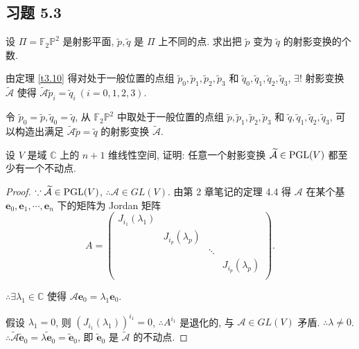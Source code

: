 \documentclass[color=black,device=normal,lang=cn,mode=geye]{elegantnote}
\begin{document}
\subsection{习题 5.3}
\begin{exercise}%
    设 $\varPi=\mathbb{F}_2\mathbb{P}^2$ 是射影平面, $\tilde{p},\tilde{q}$ 是 $\varPi$ 上不同的点. 求出把 $\tilde{p}$ 变为 $\tilde{q}$ 的射影变换的个数.
\end{exercise}
\begin{solution}
    由定理 \ref{t3.10} 得对处于一般位置的点组 $\tilde{p}_0,\tilde{p}_1,\tilde{p}_2,\tilde{p}_3$ 和 $\tilde{q}_0,\tilde{q}_1,\tilde{q}_2,\tilde{q}_3$, $\exists!$ 射影变换 $\widetilde{\mathcal{A}}$ 使得 $\widetilde{\mathcal{A}}\tilde{p}_i=\tilde{q}_i\ (i=0,1,2,3)$.

    令 $\tilde{p}_0=\tilde{p},\tilde{q}_0=\tilde{q}$, 从 $\mathbb{F}_2\mathbb{P}^2$ 中取处于一般位置的点组 $\tilde{p},\tilde{p}_1,\tilde{p}_2,\tilde{p}_3$ 和 $\tilde{q},\tilde{q}_1,\tilde{q}_2,\tilde{q}_3$, 可以构造出满足 $\widetilde{\mathcal{A}}\tilde{p}=\tilde{q}$ 的射影变换 $\widetilde{\mathcal{A}}$.
\end{solution}
\begin{exercise}%
    设 $V$ 是域 $\mathbb{C}$ 上的 $n+1$ 维线性空间, 证明: 任意一个射影变换 $\widetilde{\mathcal{A}}\in\operatorname{PGL} (V)$ 都至少有一个不动点.
\end{exercise}
\begin{proof}
    $\because\widetilde{\mathcal{A}}\in\operatorname{PGL} (V)$, $\therefore\mathcal{A}\in GL (V)$. 由第 2 章笔记的定理 4.4 得 $\mathcal{A}$ 在某个基 $\boldsymbol{e}_0,\boldsymbol{e}_1,\cdots,\boldsymbol{e}_n$ 下的矩阵为 Jordan 矩阵
    \[A=\begin{pmatrix}
        J_{i_1}(\lambda_1) \\
        & J_{i_p}(\lambda_p) \\
        && \ddots \\
        &&& J_{i_p}(\lambda_p) \\
    \end{pmatrix}.\]
    
    $\therefore\exists\lambda_1\in\mathbb{C}$ 使得 $\mathcal{A}\boldsymbol{e}_0=\lambda_1\boldsymbol{e}_0$.

    假设 $\lambda_1=0$, 则 $(J_{i_1}(\lambda_1))^{i_1}=0$, $\therefore A^{i_1}$ 是退化的, 与 $\mathcal{A}\in GL (V)$ 矛盾. $\therefore\lambda\neq0$. $\therefore\widetilde{\mathcal{A}}\tilde{\boldsymbol{e}}_0=\widetilde{\lambda\boldsymbol{e}_0}=\tilde{\boldsymbol{e}}_0$, 即 $\tilde{\boldsymbol{e}}_0$ 是 $\widetilde{\mathcal{A}}$ 的不动点.
\end{proof}
\end{document}
